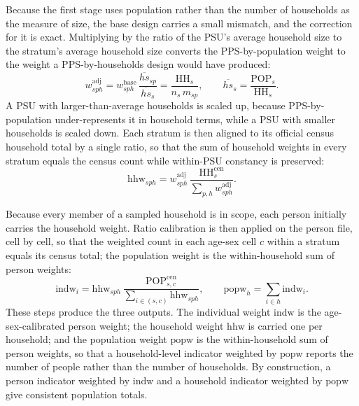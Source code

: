 \documentclass[AEJ]{AEA}
\begin{document}
Because the first stage uses population rather than the number of households as
the measure of size, the base design carries a small mismatch, and the correction
for it is exact. Multiplying by the ratio of the PSU's average household size to
the stratum's average household size converts the PPS-by-population weight to the
weight a PPS-by-households design would have produced:
%
\begin{equation}
w^{\mathrm{adj}}_{sph}
= w^{\mathrm{base}}_{sph}\,\frac{\overline{hs}_{sp}}{\overline{hs}_{s}}
= \frac{\mathrm{HH}_s}{n_s\, m_{sp}},
\qquad
\overline{hs}_{s}=\frac{\mathrm{POP}_s}{\mathrm{HH}_s}.
\end{equation}
%
A PSU with larger-than-average households is scaled up, because PPS-by-population
under-represents it in household terms, while a PSU with smaller households is
scaled down. Each stratum is then aligned to its official census household total
by a single ratio, so that the sum of household weights in every stratum equals
the census count while within-PSU constancy is preserved:
%
\begin{equation}
\mathrm{hhw}_{sph}
= w^{\mathrm{adj}}_{sph}\,
\frac{\mathrm{HH}^{\mathrm{cen}}_s}{\sum_{p,h} w^{\mathrm{adj}}_{sph}}.
\end{equation}

Because every member of a sampled household is in scope, each person initially
carries the household weight. Ratio calibration is then applied on the person file,
cell by cell, so that the weighted count in each age-sex cell $c$ within a stratum
equals its census total; the population weight is the within-household sum of
person weights:
%
\begin{equation}
\mathrm{indw}_i
= \mathrm{hhw}_{sph}\,
\frac{\mathrm{POP}^{\mathrm{cen}}_{s,c}}{\sum_{i\in(s,c)}\mathrm{hhw}_{sph}},
\qquad
\mathrm{popw}_h = \sum_{i\in h}\mathrm{indw}_i.
\end{equation}
%
These steps produce the three outputs. The individual weight $\mathrm{indw}$ is
the age-sex-calibrated person weight; the household weight $\mathrm{hhw}$ is
carried one per household; and the population weight $\mathrm{popw}$ is the
within-household sum of person weights, so that a household-level indicator
weighted by $\mathrm{popw}$ reports the number of people rather than the number of
households. By construction, a person indicator weighted by $\mathrm{indw}$ and a
household indicator weighted by $\mathrm{popw}$ give consistent population totals.

\end{document}
